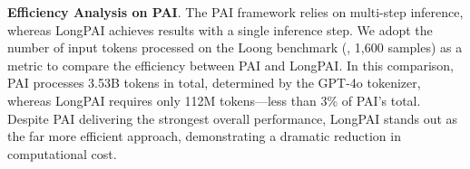 

\noindent \textbf{Efficiency Analysis on PAI}. The PAI framework relies on multi-step inference, whereas LongPAI achieves results with a single inference step. We adopt the number of input tokens processed on the Loong benchmark (\ie, 1,600 samples) as a metric to compare the efficiency between PAI and LongPAI. In this comparison, PAI processes 3.53B tokens in total, determined by the GPT-4o tokenizer, whereas LongPAI requires only 112M tokens—less than 3\% of PAI's total. Despite PAI delivering the strongest overall performance, LongPAI stands out as the far more efficient approach, demonstrating a dramatic reduction in computational cost.
